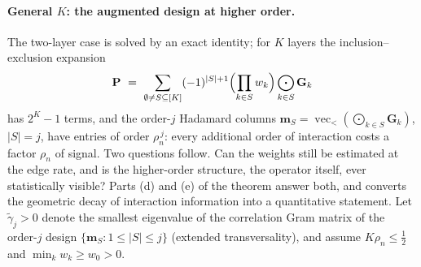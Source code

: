 \documentclass[12pt]{article}
\newcommand{\1}{\mathbf{1}}
\newcommand{\Pmat}{\mathbf{P}}
\begin{document}
\paragraph{General $K$: the augmented design at higher order.}
The two-layer case is solved by an exact identity; for $K$ layers the inclusion--exclusion expansion
\[
\Pmat\ =\ \sum_{\emptyset\ne S\subseteq[K]}(-1)^{|S|+1}\Bigl(\prod_{k\in S}w_k\Bigr)
\bigodot_{k\in S}\mathbf G_k
\]
has $2^K-1$ terms, and the order-$j$ Hadamard columns
$\mathbf m_S=\operatorname{vec}_<(\bigodot_{k\in S}\mathbf G_k)$, $|S|=j$, have entries of order
$\rho_n^{\,j}$: every additional order of interaction costs a factor $\rho_n$ of signal. Two
questions follow. Can the weights still be estimated at the edge rate, and is the higher-order
structure, the operator itself, ever statistically visible? Parts (d) and (e) of the theorem
answer both, and
converts the geometric decay of interaction information into a quantitative statement. Let
$\widetilde\gamma_j>0$ denote the smallest eigenvalue of the correlation Gram matrix of the order-$j$
design $\{\mathbf m_S:1\le|S|\le j\}$ (extended transversality), and assume
$K\rho_n\le\tfrac12$ and $\min_k w_k\ge w_0>0$.
\end{document}
